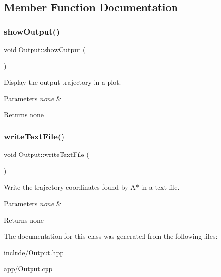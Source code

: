 \subsection{Member Function Documentation}
\mbox{\label{class_output_ade0ef9a04e645adedd3fcc82ac94f5ad}} 
\subsubsection{\texorpdfstring{show\+Output()}{showOutput()}}
{\footnotesize\ttfamily void Output\+::show\+Output (\begin{DoxyParamCaption}{ }\end{DoxyParamCaption})}



Display the output trajectory in a plot. 


\begin{DoxyParams}{Parameters}
{\em none} & \\
\hline
\end{DoxyParams}
\begin{DoxyReturn}{Returns}
none 
\end{DoxyReturn}
\mbox{\label{class_output_a50d6cb7aeb67ce25fc60df4475e171fa}} 
\subsubsection{\texorpdfstring{write\+Text\+File()}{writeTextFile()}}
{\footnotesize\ttfamily void Output\+::write\+Text\+File (\begin{DoxyParamCaption}{ }\end{DoxyParamCaption})}



Write the trajectory coordinates found by A$\ast$ in a text file. 


\begin{DoxyParams}{Parameters}
{\em none} & \\
\hline
\end{DoxyParams}
\begin{DoxyReturn}{Returns}
none 
\end{DoxyReturn}


The documentation for this class was generated from the following files\+:\begin{DoxyCompactItemize}
\item 
include/\mbox{\hyperlink{_output_8hpp}{Output.\+hpp}}\item 
app/\mbox{\hyperlink{_output_8cpp}{Output.\+cpp}}\end{DoxyCompactItemize}
